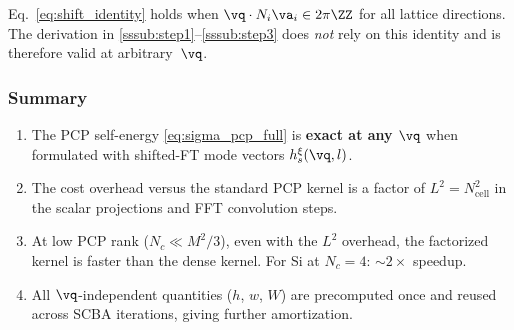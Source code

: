Eq.~\eqref{eq:shift_identity} holds when $\vq \cdot N_i \va_i
\in 2\pi\ZZ$ for all lattice directions.  The derivation in
\cref{sssub:step1}--\cref{sssub:step3} does \emph{not} rely on
this identity and is therefore valid at arbitrary~$\vq$.


\subsubsection{Summary}
\label{sssub:summary}

\begin{enumerate}
  \item The PCP self-energy
    \cref{eq:sigma_pcp_full} is \textbf{exact at any $\vq$} when
    formulated with shifted-FT mode vectors $h_s^\xi(\vq, l)$.

  \item The cost overhead versus the standard PCP kernel is a
    factor of $L^2 = N_\mathrm{cell}^2$ in the scalar projections
    and FFT convolution steps.

  \item At low PCP rank ($N_c \ll M^2/3$), even with the $L^2$
    overhead, the factorized kernel is faster than the dense
    kernel.  For Si at $N_c = 4$: $\sim 2\times$ speedup.

  \item All $\vq$-independent quantities ($h$, $w$, $W$) are
    precomputed once and reused across SCBA iterations, giving
    further amortization.
\end{enumerate}
